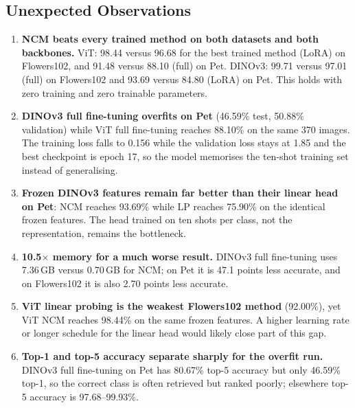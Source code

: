\documentclass[journal,11pt]{IEEEtran}
\begin{document}
\subsection{Unexpected Observations}
\begin{enumerate}
  \item \textbf{NCM beats every trained method on both datasets and both backbones.} ViT: 98.44 versus 96.68 for the best trained method (LoRA) on Flowers102, and 91.48 versus 88.10 (full) on Pet. DINOv3: 99.71 versus 97.01 (full) on Flowers102 and 93.69 versus 84.80 (LoRA) on Pet. This holds with zero training and zero trainable parameters.
  \item \textbf{DINOv3 full fine-tuning overfits on Pet} (46.59\% test, 50.88\% validation) while ViT full fine-tuning reaches 88.10\% on the same 370 images. The training loss falls to 0.156 while the validation loss stays at 1.85 and the best checkpoint is epoch 17, so the model memorises the ten-shot training set instead of generalising.
  \item \textbf{Frozen DINOv3 features remain far better than their linear head on Pet}: NCM reaches 93.69\% while LP reaches 75.90\% on the identical frozen features. The head trained on ten shots per class, not the representation, remains the bottleneck.
  \item \textbf{10.5$\times$ memory for a much worse result.} DINOv3 full fine-tuning uses 7.36\,GB versus 0.70\,GB for NCM; on Pet it is 47.1 points less accurate, and on Flowers102 it is also 2.70 points less accurate.
  \item \textbf{ViT linear probing is the weakest Flowers102 method} (92.00\%), yet ViT NCM reaches 98.44\% on the same frozen features. A higher learning rate or longer schedule for the linear head would likely close part of this gap.
  \item \textbf{Top-1 and top-5 accuracy separate sharply for the overfit run.} DINOv3 full fine-tuning on Pet has 80.67\% top-5 accuracy but only 46.59\% top-1, so the correct class is often retrieved but ranked poorly; elsewhere top-5 accuracy is 97.68--99.93\%.
\end{enumerate}
\end{document}
